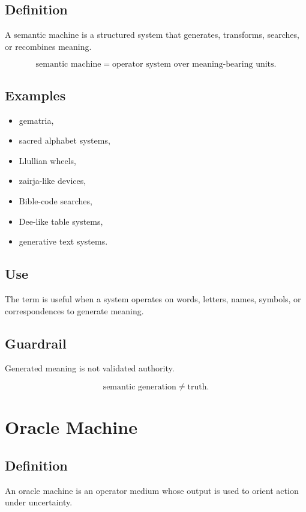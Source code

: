\documentclass[11pt]{book}
\begin{document}
\subsection*{Definition}

A semantic machine is a structured system that generates, transforms, searches, or recombines meaning.

\[
\text{semantic machine} = \text{operator system over meaning-bearing units}.
\]

\subsection*{Examples}

\begin{itemize}
    \item gematria,
    \item sacred alphabet systems,
    \item Llullian wheels,
    \item zairja-like devices,
    \item Bible-code searches,
    \item Dee-like table systems,
    \item generative text systems.
\end{itemize}

\subsection*{Use}

The term is useful when a system operates on words, letters, names, symbols, or correspondences to generate meaning.

\subsection*{Guardrail}

Generated meaning is not validated authority.

\[
\text{semantic generation} \neq \text{truth}.
\]

\section{Oracle Machine}

\subsection*{Definition}

An oracle machine is an operator medium whose output is used to orient action under uncertainty.
\end{document}
